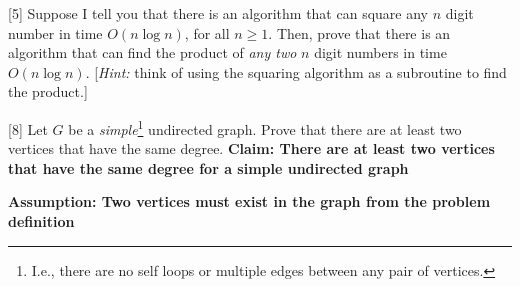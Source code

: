 \documentclass[addpoints]{exam}
\renewcommand{\gcd}{\textsc{Gcd}}
\begin{document}
\begin{questions}



[5]
Suppose I tell you that there is an algorithm that can square any $n$ digit number in time $O(n \log n)$, for all $n\ge 1$. Then, prove that there is an algorithm that can find the product of {\em any two} $n$ digit numbers in time $O(n \log n)$.  [{\em Hint:} think of using the squaring algorithm as a subroutine to find the product.]

[8]
Let $G$ be a {\em simple}\footnote{I.e., there are no self loops or multiple edges between any pair of vertices.} undirected graph. Prove that there are at least two vertices that have the same degree. 
\textbf{Claim: There are at least two vertices that have the same degree for a simple undirected graph}

\textbf{Assumption: Two vertices must exist in the graph from the problem definition}


\end{questions}
\end{document}
